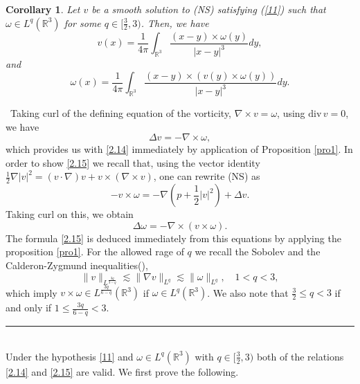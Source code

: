 \documentclass[12pt]{article}
\numberwithin{equation}{section}
\newtheorem{cor}{Corollary}[section]
\theoremstyle{definition}
\begin{document}
\begin{cor}\label{cor1}
Let $v$ be a smooth solution to (NS) satisfying (\ref{11})  such that ${\omega} \in L^q(\mathbb{R}^3)$ for some $q\in[\frac{3}{2},3)$.
Then, we have
\begin{equation}\label{2.14}
v(x)=\frac{1}{4\pi}\int_{\mathbb{R}^3}\frac{(x-y)\times {\omega}(y)}{|x-y|^3}dy,
\end{equation}
and
\begin{equation}\label{2.15}
{\omega}(x)=\frac{1}{4\pi}\int_{\mathbb{R}^3}\frac{(x-y)\times (v(y)\times {\omega}(y))}{|x-y|^3}dy.
\end{equation}
\end{cor}
 \, Taking curl of the defining equation of the vorticity, $\nabla\times v={\omega}$, using $\text{div}\,v=0$, we have
$$\Delta v=-\nabla \times {\omega} ,$$
which provides us with \eqref{2.14} immediately by application of Proposition \ref{pro1}.
In order to show \eqref{2.15} we recall that, using the vector identity $\frac{1}{2}\nabla|v|^2=(v\cdot\nabla)v+v\times(\nabla\times v)$,
one can rewrite (NS)  as
$$-v\times {\omega}= -\nabla\left(p+\frac{1}{2}|v|^2\right) +\Delta v.$$
Taking curl on this, we obtain
$$\Delta {\omega} = -\nabla \times(v\times {\omega}).$$
The formula \eqref{2.15} is deduced immediately from this equations by applying the proposition \ref{pro1}.
For the allowed rage of $q$ we recall the Sobolev and the Calderon-Zygmund inequalities(\cite{Stein}),
\begin{equation}\label{2.16}
\|v\|_{L^{\frac{3q}{3-q}}}  \lesssim  \|\nabla v\|_{L^q} \lesssim \|{\omega}\|_{L^q},\quad 1<q<3,
\end{equation}
which imply $v \times {\omega} \in L^{\frac{3q}{6-q}}(\mathbb{R}^3)$ if $ {\omega}\in L^{q}(\mathbb{R}^3)$. We also note that $\frac{3}{2}\leq q <3 $
if and only if $1\leq\frac{3q}{6-q}<3$.  \hfill {\rule{0.2cm}{0.2cm}} \\

 Under the hypothesis \eqref{11} and ${\omega}\in L^q(\mathbb{R}^3)$ with $q \in [\frac{3}{2},3)$
both of the relations \eqref{2.14} and \eqref{2.15} are valid. We first prove the following.\\
\end{document}
